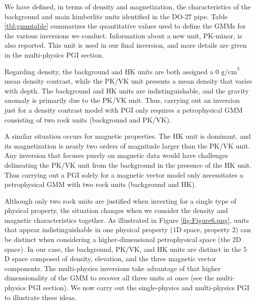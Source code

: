 \documentclass[paper, twocolumn]{geophysics} %
\begin{document}
We have defined, in terms of density and magnetization, the characteristics of the background and main kimberlite units identified in the DO-$27$ pipe. Table \ref{tbl:gmmtable} summarizes the quantitative values used to define the GMMs for the various inversions we conduct. Information about a new unit, PK-minor, is also reported. This unit is used in our final inversion, and more details are given in the multi-physics PGI section.

Regarding density, the background and HK units are both assigned a $ 0 \text{ g/cm}^3$ mean density contrast, while the PK/VK unit presents a mean density that varies with depth. The background and HK units are indistinguishable, and the gravity anomaly is primarily due to the PK/VK unit. Thus, carrying out an inversion just for a density contrast model with PGI only requires a petrophysical GMM consisting of two rock units (background and PK/VK).


A similar situation occurs for magnetic properties. The HK unit is dominant, and its magnetization is nearly two orders of magnitude larger than the PK/VK unit. Any inversion that focuses purely on magnetic data would have challenges delineating the PK/VK unit from the background in the presence of the HK unit. Thus carrying out a PGI solely for a magnetic vector model only necessitates a petrophysical GMM with two rock units (background and HK).



Although only two rock units are justified when inverting for a single type of physical property, the situation changes when we consider the density and magnetic characteristics together. As illustrated in Figure \ref{fig:Figure6.png}, units that appear indistinguishable in one physical property ($1$D space, property $2$) can be distinct when considering a higher-dimensional petrophysical space (the $2$D space). In our case, the background, PK/VK, and HK units are distinct in the $5$D space composed of density, elevation, and the three magnetic vector components. The multi-physics inversions take advantage of that higher dimensionality of the GMM to recover all three units at once (see the multi-physics PGI section). We now carry out the single-physics and multi-physics PGI to illustrate these ideas.
\end{document}
